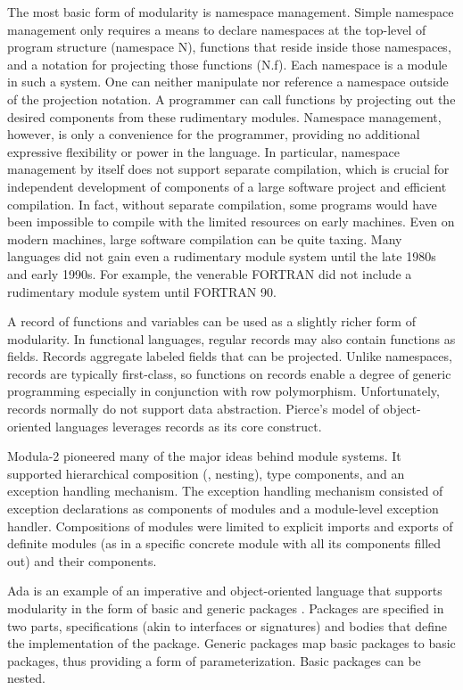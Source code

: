 \documentclass[12pt]{article}
\begin{document}
The most basic form of modularity is namespace management. Simple namespace management only requires a means to declare namespaces at the top-level of program structure (namespace N), functions that reside inside those namespaces, and a notation for projecting those functions (N.f). Each namespace is a module in such a system. One can neither manipulate nor reference a namespace outside of the projection notation. A programmer can call functions by projecting out the desired components from these rudimentary modules. Namespace management, however, is only a convenience for the programmer, providing no additional expressive flexibility or power in the language. In particular, namespace management by itself does not support separate compilation, which is crucial for independent development of components of a large software project and efficient compilation. In fact, without separate compilation, some programs would have been impossible to compile with the limited resources on early machines. Even on modern machines, large software compilation can be quite taxing. Many languages did not gain even a rudimentary module system until the late 1980s and early 1990s. For example, the venerable FORTRAN did not include a rudimentary module system until FORTRAN 90. 

A record of functions and variables can be used as a slightly richer form of modularity. In functional languages, regular records may also contain functions as fields. Records aggregate labeled fields that can be projected. Unlike namespaces, records are typically first-class, so functions on records enable a degree of generic programming especially in conjunction with row polymorphism\cite{remy:popl89}. Unfortunately, records normally do not support data abstraction. Pierce's model of object-oriented languages leverages records as its core construct\cite{Pierce:TypeSystems}. 

Modula-2 pioneered many of the major ideas behind module systems. It supported hierarchical composition (\ie, nesting), type components, and an exception handling mechanism\cite{wirth:module}. The exception handling mechanism consisted of exception declarations as components of modules and a module-level exception handler. Compositions of modules were limited to explicit imports and exports of definite modules (as in a specific concrete module with all its components filled out) and their components. 

Ada is an example of an imperative and object-oriented language that supports modularity in the form of basic and generic packages \cite{bray:impl}. Packages are specified in two parts, specifications (akin to interfaces or signatures) and bodies that define the implementation of the package. Generic packages map basic packages to basic packages, thus providing a form of parameterization. Basic packages can be nested. 
\end{document}
